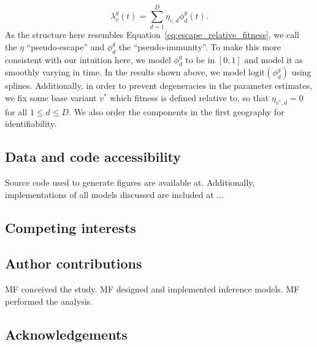 \documentclass[12pt,oneside,letterpaper]{article}
\begin{document}
\begin{equation}
    \lambda_{v}^{g}(t) = \sum_{d=1}^{D} \eta_{v,d} \phi_{d}^{g}(t). 
\end{equation}
As the structure here resembles Equation~\ref{eq:escape_relative_fitness}, we call the $\eta$ ``pseudo-escape'' and $\phi_{d}^{g}$ the ``pseudo-immunity''.
To make this more consistent with our intuition here, we model $\phi_{d}^{g}$ to be in $[0,1]$ and model it as smoothly varying in time.
In the results shown above, we model $\text{logit}(\phi_{d}^{g})$ using splines.
Additionally, in order to prevent degeneracies in the parameter estimates, we fix some base variant $v^*$ which fitness is defined relative to, so that $\eta_{v^*, d} = 0$ for all $1\leq d\leq D$.
We also order the components in the first geography for identifiability.


\subsection*{Data and code accessibility}

Source code used to generate figures are available at. 
Additionally, implementations of all models discussed are included at ...

\subsection*{Competing interests}%

\subsection*{Author contributions}
MF conceived the study. 
MF designed and implemented inference models. 
MF performed the analysis. 


\subsection*{Acknowledgements}%




\newpage

\appendix

\setcounter{figure}{0}
\setcounter{table}{0}
\setcounter{page}{1}
\renewcommand{\thefigure}{S\arabic{figure}}
\renewcommand{\thetable}{S\arabic{table}}
\renewcommand{\thepage}{S\arabic{page}}
\renewcommand{\thesubsection}{S\arabic{subsection}}
\end{document}
